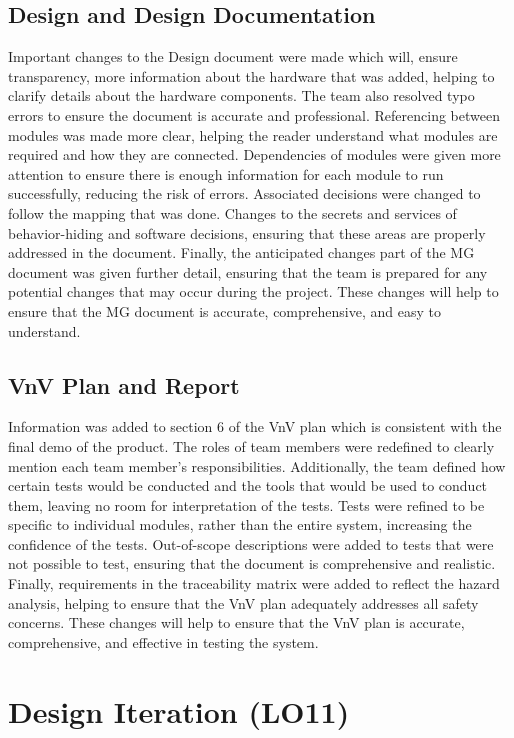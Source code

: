 \documentclass{article}
\begin{document}
\subsection{Design and Design Documentation}

Important changes to the Design document were made which will, ensure transparency, more information about the hardware that was added, helping to clarify details about the hardware components. The team also resolved typo errors to ensure the document is accurate and professional. Referencing between modules was made more clear, helping the reader understand what modules are required and how they are connected. Dependencies of modules were given more attention to ensure there is enough information for each module to run successfully, reducing the risk of errors. Associated decisions were changed to follow the mapping that was done. Changes to the secrets and services of behavior-hiding and software decisions, ensuring that these areas are properly addressed in the document. Finally, the anticipated changes part of the MG document was given further detail, ensuring that the team is prepared for any potential changes that may occur during the project. These changes will help to ensure that the MG document is accurate, comprehensive, and easy to understand.


\subsection{VnV Plan and Report}

Information was added to section 6 of the VnV plan which is consistent with the final demo of the product. The roles of team members were redefined to clearly mention each team member's responsibilities. Additionally, the team defined how certain tests would be conducted and the tools that would be used to conduct them, leaving no room for interpretation of the tests. Tests were refined to be specific to individual modules, rather than the entire system, increasing the confidence of the tests. Out-of-scope descriptions were added to tests that were not possible to test, ensuring that the document is comprehensive and realistic. Finally, requirements in the traceability matrix were added to reflect the hazard analysis, helping to ensure that the VnV plan adequately addresses all safety concerns. These changes will help to ensure that the VnV plan is accurate, comprehensive, and effective in testing the system.


\section{Design Iteration (LO11)}
\end{document}
